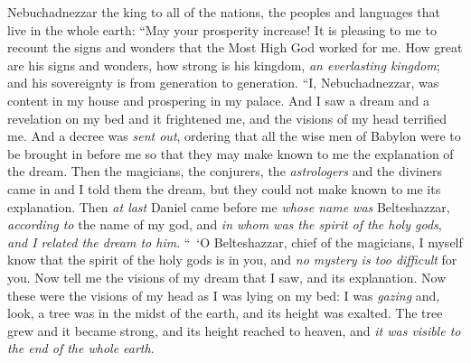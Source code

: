 \begin{biblechapter} %
  Nebuchadnezzar the king to all of the nations, the peoples and languages that live in the whole earth: “May your prosperity increase!
\verse It is pleasing to me to recount the signs and wonders that the Most High God worked for me.
\verse How great are his signs and wonders, how strong is his kingdom, \textit{an everlasting kingdom}; and his sovereignty is from generation to generation.
 “I, Nebuchadnezzar, was content in my house and prospering in my palace.
\verse And I saw a dream and a revelation on my bed and it frightened me, and the visions of my head terrified me.
\verse And a decree was \textit{sent out}, ordering that all the wise men of Babylon were to be brought in before me so that they may make known to me the explanation of the dream.
\verse Then the magicians, the conjurers, the \textit{astrologers} and the diviners came in and I told them the dream, but they could not make known to me its explanation.
\verse Then \textit{at last} Daniel came before me \textit{whose name was} Belteshazzar, \textit{according to} the name of my god, and \textit{in whom was the spirit of the holy gods}, \textit{and I related the dream to him}.
\verse “ ‘O Belteshazzar, chief of the magicians, I myself know that the spirit of the holy gods is in you, and \textit{no mystery is too difficult} for you. Now tell me the visions of my dream that I saw, and its explanation.
\verse Now these were the visions of my head as I was lying on my bed: I was \textit{gazing} and, look, a tree was in the midst of the earth, and its height was exalted.
\verse The tree grew and it became strong, 
and its height reached to heaven, 
and \textit{it was visible to the end of the whole earth}.

\end{biblechapter}

